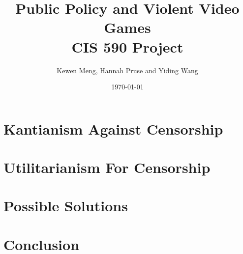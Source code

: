 \documentclass[11pt]{article}
\title{%
  Public Policy and Violent Video Games \\
  \large CIS 590 Project\vspace{-2ex}}
\author{Kewen Meng, Hannah Pruse and Yiding Wang}
\date{\today}
\begin{document}
\maketitle
\vspace{-5mm}



\section*{Kantianism Against Censorship}


\section*{Utilitarianism For Censorship}

 
\section*{Possible Solutions}


\section*{Conclusion}



\end{document}

